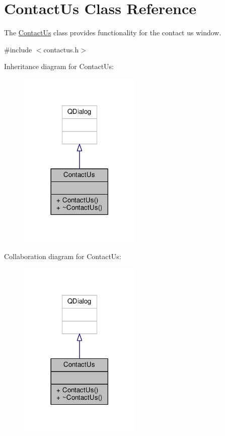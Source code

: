 \hypertarget{classContactUs}{}\section{Contact\+Us Class Reference}
\label{classContactUs}


The \hyperlink{classContactUs}{Contact\+Us} class provides functionality for the contact us window.  




{\ttfamily \#include $<$contactus.\+h$>$}



Inheritance diagram for Contact\+Us\+:\nopagebreak
\begin{figure}[H]
\begin{center}
\leavevmode
\includegraphics[width=165pt]{classContactUs__inherit__graph}
\end{center}
\end{figure}


Collaboration diagram for Contact\+Us\+:\nopagebreak
\begin{figure}[H]
\begin{center}
\leavevmode
\includegraphics[width=165pt]{classContactUs__coll__graph}
\end{center}
\end{figure}
